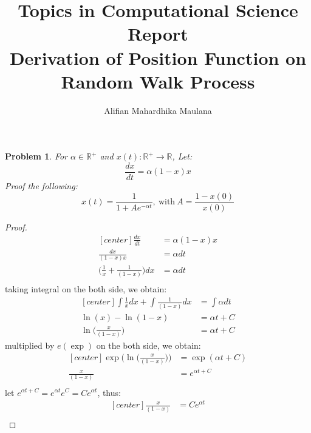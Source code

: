 \documentclass[a4paper,9pt]{article}
\title{Topics in Computational Science Report \\ Derivation of Position Function on Random Walk Process}
\author{Alifian Mahardhika Maulana}
\newtheorem{prob}{Problem}
\newcommand{\R}{\mathbb{R}}
\begin{document}
\maketitle
\begin{prob}
	For $\alpha \in \R^+$ and $x(t) : \R^+ \rightarrow \R$, Let:
	\begin{equation}
	\frac{dx}{dt} = \alpha(1-x)x
	\end{equation}
	Proof the following:
	\begin{equation*}
	x(t) = \frac{1}{1+Ae^{-\alpha t}},\ \text{with}\ A=\frac{1-x(0)}{x(0)}
	\end{equation*}
\end{prob}
\begin{proof}
	\begin{equation*}
	\begin{aligned}[center]
		\frac{dx}{dt} &= \alpha(1-x)x\\
		\frac{dx}{(1-x)x} &= \alpha dt\\
		\bigg(\frac{1}{x} + \frac{1}{(1-x)}\bigg) dx &= \alpha dt\\
	\end{aligned}
	\end{equation*}
	taking integral on the both side, we obtain:
	\begin{equation*}
	\begin{aligned}[center]
	\int \frac{1}{x} dx + \int \frac{1}{(1-x)} dx &= \int \alpha dt\\
	\ln(x) - \ln(1-x) &= \alpha t + C\\
	\ln\bigg(\frac{x}{(1-x)}\bigg) &= \alpha t + C
	\end{aligned}
	\end{equation*}
	multiplied by $e(\exp)$ on the both side, we obtain:
	\begin{equation*}
	\begin{aligned}[center]
	\exp\bigg(\ln\bigg(\frac{x}{(1-x)}\bigg)\bigg) &= \exp(\alpha t + C)\\
	\frac{x}{(1-x)} &= e^{\alpha t + C}\\
	\end{aligned}
	\end{equation*}
	let $e^{\alpha t + C} = e^{\alpha t}e^{C}=Ce^{\alpha t}$, thus:
	\begin{equation}\label{eq:2}
	\begin{aligned}[center]
	\frac{x}{(1-x)} &= Ce^{\alpha t}\\
	\end{aligned}
	\end{equation}

\end{proof}
\end{document}
